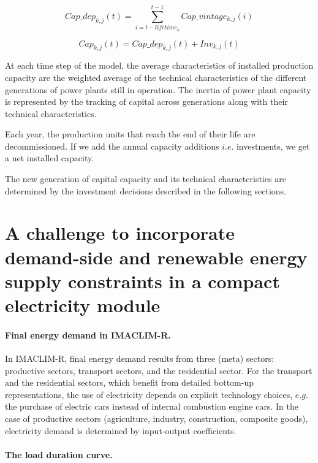 \begin{dmath}
    Cap \_ dep_{k,j}(t) = \sum_{i = t - lifetime_{k}}^{t-1}Cap\_vintage_{k,j}(i)
    \label{eqn:Cap_elec_dep}
\end{dmath}

\begin{dmath}
    Cap_{k,j}(t) = Cap\_dep_{k,j}(t) + Inv_{k,j}(t)
    \label{eqn:Cap_elec}
\end{dmath}




At each time step of the model, the average characteristics of installed production capacity are the weighted average of the technical characteristics of the different generations of power plants still in operation.
The inertia of power plant capacity is represented by the tracking of capital across generations along with their technical characteristics.

Each year, the production units that reach the end of their life are decommissioned.
If we add the annual capacity additions $i.e.$ investments, we get a net installed capacity.

The new generation of capital capacity and its technical characteristics are determined by the investment decisions described in the following sections.
\section{A challenge to incorporate demand-side and renewable energy supply constraints in a compact electricity module}

\paragraph{Final energy demand in IMACLIM-R.}

In IMACLIM-R, final energy demand results from three (meta) sectors: productive sectors, transport sectors, and the residential sector. For the transport and the residential sectors, which benefit from detailed bottom-up representations, the use of electricity depends on explicit technology choices, $e.g.$ the purchase of electric cars instead of internal combustion engine cars. In the case of productive sectors (agriculture, industry, construction, composite goods), electricity demand is determined by input-output coefficients.

\paragraph{The load duration curve.}


